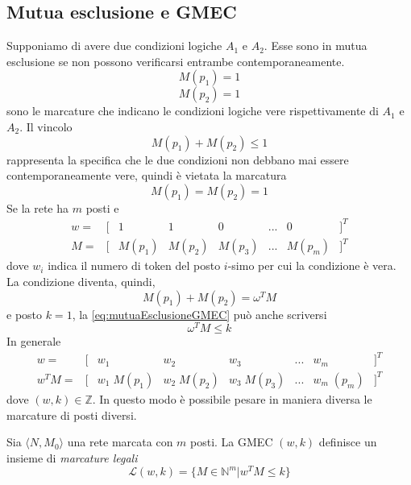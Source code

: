 \documentclass[a4paper]{report}
\begin{document}
\subsection{Mutua esclusione e GMEC}
Supponiamo di avere due condizioni logiche $A_1$ e $A_2$. Esse sono in
mutua esclusione se non possono verificarsi entrambe
contemporaneamente.
\[
M(p_1) = 1
\]
\[
M(p_2) = 1
\]
sono le marcature che indicano le condizioni logiche vere
rispettivamente di $A_1$ e $A_2$. Il vincolo
\begin{equation}\label{eq:mutuaEsclusioneGMEC}
M(p_1) + M(p_2) \leq 1
\end{equation}
rappresenta la specifica che le due condizioni non debbano mai essere
contemporaneamente vere, quindi \`e vietata la marcatura
\[
M(p_1) = M(p_2) = 1
\]
Se la rete ha $m$ posti e
\[
\begin{array}{cccccccc}
  w = & [ & 1 & 1 & 0 & ... & 0 & ]^T\\
  M = & [ & M(p_1) & M(p_2) & M(p_3) & ... & M(p_m) & ]^T
\end{array}
\]
dove $w_i$ indica il numero di token del posto $i$-simo per cui la
condizione \`e vera. La condizione diventa, quindi,
\[
M(p_1) + M(p_2) = \omega^T M
\]
e posto $k = 1$, la \ref{eq:mutuaEsclusioneGMEC} pu\`o anche
scriversi
\[
\omega^T M \leq k
\]
In generale
\[
\begin{array}{cccccccc}
  w = & [ & w_1 & w_2 & w_3 & ... & w_m & ]^T\\
  w^T M = & [ & w_1\;M(p_1) & w_2\;M(p_2) & w_3\;M(p_3) & ... & w_m\;(p_m) & ]^T
\end{array}
\]
dove $(w,k) \in \mathbb{Z}$. In questo modo \`e possibile pesare in
maniera diversa le marcature di posti diversi.

Sia $\langle N, M_0 \rangle$ una rete marcata con $m$ posti. La GMEC
$(w,k)$ definisce un insieme di {\em marcature legali}
\[
\mathcal{L}(w,k) = \{ M \in \mathbb{N}^m | w^T M \leq k \}
\]
\end{document}
